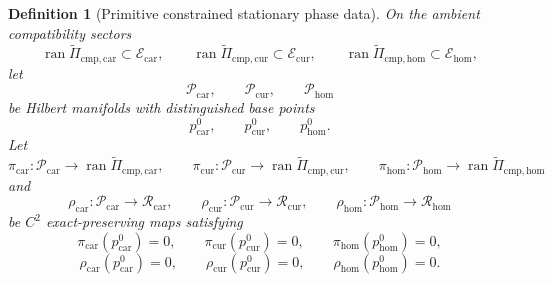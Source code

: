 \documentclass[11pt]{article}
\newcommand{\TensorEqClass}{\mathscr E_{\mathrm{car}}}
\newcommand{\CurEqClass}{\mathscr E_{\mathrm{cur}}}
\newcommand{\HomEqClass}{\mathscr E_{\mathrm{hom}}}
\newcommand{\TensorEqCmpProj}{\widetilde\Pi_{\mathrm{cmp,car}}}
\newcommand{\CurEqCmpProj}{\widetilde\Pi_{\mathrm{cmp,cur}}}
\newcommand{\HomEqCmpProj}{\widetilde\Pi_{\mathrm{cmp,hom}}}
\newcommand{\TensorPhaseClass}{\mathscr P_{\mathrm{car}}}
\newcommand{\CurPhaseClass}{\mathscr P_{\mathrm{cur}}}
\newcommand{\HomPhaseClass}{\mathscr P_{\mathrm{hom}}}
\newcommand{\TensorPhaseReadClass}{\mathscr R_{\mathrm{car}}}
\newcommand{\CurPhaseReadClass}{\mathscr R_{\mathrm{cur}}}
\newcommand{\HomPhaseReadClass}{\mathscr R_{\mathrm{hom}}}
\newcommand{\TensorPhaseBase}{p_{\mathrm{car}}^0}
\newcommand{\CurPhaseBase}{p_{\mathrm{cur}}^0}
\newcommand{\HomPhaseBase}{p_{\mathrm{hom}}^0}
\newcommand{\TensorPhaseProj}{\pi_{\mathrm{car}}}
\newcommand{\CurPhaseProj}{\pi_{\mathrm{cur}}}
\newcommand{\HomPhaseProj}{\pi_{\mathrm{hom}}}
\newcommand{\TensorPhaseRead}{\rho_{\mathrm{car}}}
\newcommand{\CurPhaseRead}{\rho_{\mathrm{cur}}}
\newcommand{\HomPhaseRead}{\rho_{\mathrm{hom}}}
\newtheorem{definition}{Definition}
\begin{document}
\begin{definition}[Primitive constrained stationary phase data]
\label{def:primitive_stationary_phase}
On the ambient compatibility sectors
\[
\operatorname{ran}\TensorEqCmpProj\subset\TensorEqClass,\qquad
\operatorname{ran}\CurEqCmpProj\subset\CurEqClass,\qquad
\operatorname{ran}\HomEqCmpProj\subset\HomEqClass,
\]
let
\[
\TensorPhaseClass,\qquad
\CurPhaseClass,\qquad
\HomPhaseClass
\]
be Hilbert manifolds with distinguished base points
\[
\TensorPhaseBase,\qquad
\CurPhaseBase,\qquad
\HomPhaseBase.
\]
Let
\[
\TensorPhaseProj:\TensorPhaseClass\to\operatorname{ran}\TensorEqCmpProj,\qquad
\CurPhaseProj:\CurPhaseClass\to\operatorname{ran}\CurEqCmpProj,\qquad
\HomPhaseProj:\HomPhaseClass\to\operatorname{ran}\HomEqCmpProj
\]
and
\[
\TensorPhaseRead:\TensorPhaseClass\to\TensorPhaseReadClass,\qquad
\CurPhaseRead:\CurPhaseClass\to\CurPhaseReadClass,\qquad
\HomPhaseRead:\HomPhaseClass\to\HomPhaseReadClass
\]
be \(C^2\) exact-preserving maps satisfying
\begin{equation}
\TensorPhaseProj(\TensorPhaseBase)=0,\qquad
\CurPhaseProj(\CurPhaseBase)=0,\qquad
\HomPhaseProj(\HomPhaseBase)=0,
\label{eq:phase_proj_zero}
\end{equation}
\begin{equation}
\TensorPhaseRead(\TensorPhaseBase)=0,\qquad
\CurPhaseRead(\CurPhaseBase)=0,\qquad
\HomPhaseRead(\HomPhaseBase)=0.
\label{eq:phase_read_zero}
\end{equation}


\end{definition}
\end{document}
